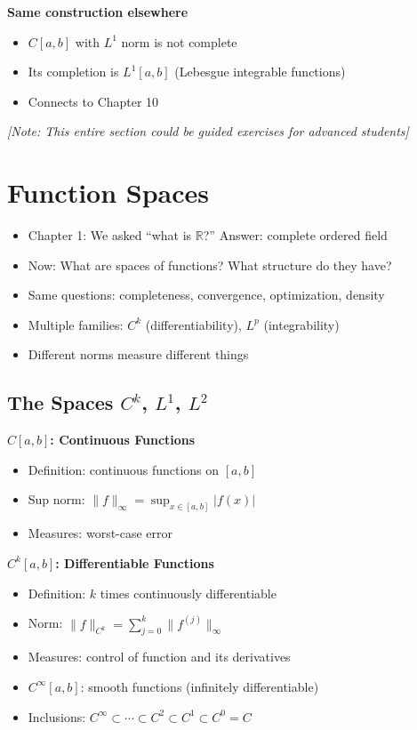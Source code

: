 \documentclass[
  10pt,
  letterpaper,
]{scrbook}
\providecommand{\tightlist}{%
  \setlength{\itemsep}{0pt}\setlength{\parskip}{0pt}}
\begin{document}
\textbf{Same construction elsewhere}

\begin{itemize}
\tightlist
\item
  \(C[a,b]\) with \(L^1\) norm is not complete
\item
  Its completion is \(L^1[a,b]\) (Lebesgue integrable functions)
\item
  Connects to Chapter 10
\end{itemize}

\emph{{[}Note: This entire section could be guided exercises for
advanced students{]}}

\chapter{Function Spaces}\label{function-spaces}

\begin{itemize}
\tightlist
\item
  Chapter 1: We asked ``what is \(\mathbb{R}\)?'' Answer: complete
  ordered field
\item
  Now: What are spaces of functions? What structure do they have?
\item
  Same questions: completeness, convergence, optimization, density
\item
  Multiple families: \(C^k\) (differentiability), \(L^p\)
  (integrability)
\item
  Different norms measure different things
\end{itemize}

\section{\texorpdfstring{The Spaces \(C^k\), \(L^1\),
\(L^2\)}{The Spaces C\^{}k, L\^{}1, L\^{}2}}\label{the-spaces-ck-l1-l2}

\textbf{\(C[a,b]\): Continuous Functions}

\begin{itemize}
\tightlist
\item
  Definition: continuous functions on \([a,b]\)
\item
  Sup norm: \(\|f\|_\infty = \sup_{x \in [a,b]} |f(x)|\)
\item
  Measures: worst-case error
\end{itemize}

\textbf{\(C^k[a,b]\): Differentiable Functions}

\begin{itemize}
\tightlist
\item
  Definition: \(k\) times continuously differentiable
\item
  Norm: \(\|f\|_{C^k} = \sum_{j=0}^k \|f^{(j)}\|_\infty\)
\item
  Measures: control of function and its derivatives
\item
  \(C^\infty[a,b]\): smooth functions (infinitely differentiable)
\item
  Inclusions:
  \(C^\infty \subset \cdots \subset C^2 \subset C^1 \subset C^0 = C\)
\end{itemize}
\end{document}
